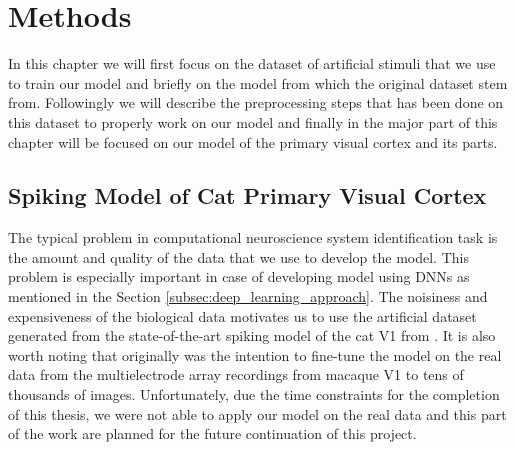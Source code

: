 \chapter{Methods}
\label{chap:methods}
In this chapter we will first focus on the dataset of artificial stimuli that we use to train our model and briefly on the model from which the original dataset stem from. Followingly we will describe the preprocessing steps that has been done on this dataset to properly work on our model and finally in the major part of this chapter will be focused on our model of the primary visual cortex and its parts.

\section{Spiking Model of Cat Primary Visual Cortex}
\label{sec:cats_model}
The typical problem in computational neuroscience system identification task is the amount and quality of the data that we use to develop the model. This problem is especially important in case of developing model using DNNs as mentioned in the Section \ref{subsec:deep_learning_approach}. The noisiness and expensiveness of the biological data motivates us to use the artificial dataset generated from the state-of-the-art spiking model of the cat V1 from \citet{antolik2024comprehensive}. It is also worth noting that originally was the intention to fine-tune the model on the real data from the multielectrode array recordings from macaque V1 to tens of thousands of images. Unfortunately, due the time constraints for the completion of this thesis, we were not able to apply our model on the real data and this part of the work are planned for the future continuation of this project.

